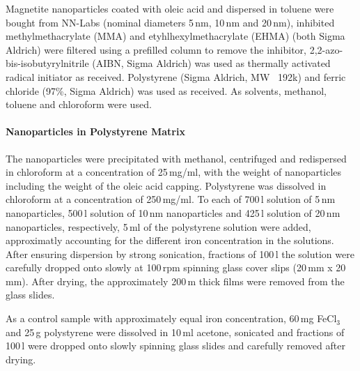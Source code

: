 Magnetite nanoparticles coated with oleic acid and dispersed in toluene were bought from NN-Labs (nominal diameters 5\,nm, 10\,nm and 20\,nm), inhibited methylmethacrylate (MMA) and etyhlhexylmethacrylate (EHMA)  (both Sigma Aldrich) were filtered using a prefilled column to remove the inhibitor,  2,2-azo-bis-isobutyrylnitrile (AIBN, Sigma Aldrich) was used as thermally activated radical initiator as received. Polystyrene (Sigma Aldrich, MW ~192k) and ferric chloride (97\%, Sigma Aldrich) was used as received. As solvents, methanol, toluene and chloroform were used.
\paragraph{Nanoparticles in Polystyrene Matrix} 
The nanoparticles were precipitated with methanol, centrifuged and redispersed in chloroform at a concentration of 25\,mg/ml, with the weight of nanoparticles including the weight of the oleic acid capping. Polystyrene was dissolved in chloroform at a concentration of 250\,mg/ml. 
To each of 700\,\textmu l solution of 5\,nm nanoparticles, 500\,\textmu l solution of 10\,nm nanoparticles and 425\,\textmu l solution of 20\,nm nanoparticles, respectively, 5\,ml of the polystyrene solution were added, approximatly accounting for the different iron concentration in the solutions.  After ensuring dispersion by strong sonication, fractions of 100\,\textmu l the solution were carefully dropped onto slowly at 100\,rpm spinning glass cover slips (20\,mm x 20\,mm). After drying, the approximately 200\,\textmu m thick films were removed from the glass slides.

As a control sample with approximately equal iron concentration, 60\,mg FeCl$_{3}$ and 25\,g polystyrene were dissolved in 10\,ml acetone, sonicated and  fractions of 100\,\textmu l were dropped onto slowly spinning glass slides  and carefully removed after drying.

